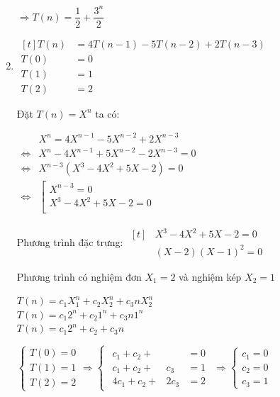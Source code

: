 \documentclass[12pt, letterpaper]{article}
\begin{document}
\begin{enumerate}
	      $ \Rightarrow T(n) = \dfrac{1}{2} + \dfrac{3^n}{2} $

	\item $ \begin{aligned}[t]
			      T(n) & = 4T(n - 1) - 5T(n - 2) + 2T(n - 3) \\
			      T(0) & = 0                                 \\
			      T(1) & = 1                                 \\
			      T(2) & = 2
		      \end{aligned} $

	      Đặt $ T(n) = X^n $ ta có:

	      $ \begin{aligned}
			                      & X^n = 4X^{n - 1} - 5X^{n - 2} + 2X^{n - 3}     \\
			      \Leftrightarrow & X^n - 4X^{n - 1} + 5X^{n - 2} - 2X^{n - 3} = 0 \\
			      \Leftrightarrow & X^{n - 3}(X^3 - 4X^2 + 5X - 2) = 0             \\
			      \Leftrightarrow & \left[
			      \begin{array}{ll}
				      X^{n - 3} = 0           \\
				      X^3 - 4X^2 + 5X - 2 = 0 \\
			      \end{array}
			      \right .
		      \end{aligned} $

	      Phương trình đặc trưng: $ \begin{aligned}[t]
			       & X^3 - 4X^2 + 5X - 2 = 0 \\
			       & (X - 2){(X - 1)}^2 = 0
		      \end{aligned} $

	      Phương trình có nghiệm đơn $ X_1 = 2 $ và nghiệm kép $ X_2 = 1 $

	      $ T(n) = c_1X_1^n + c_2X_2^n + c_3nX_2^n $ \\
	      $ T(n) = c_1 2^n + c_2 1^n + c_3n 1^n $ \\
	      $ T(n) = c_1 2^n + c_2 + c_3n $

	      $ \begin{cases}
			      T(0) = 0 \\
			      T(1) = 1 \\
			      T(2) = 2
		      \end{cases}
		      \Rightarrow{}
		      \begin{cases}
			      \begin{aligned}
				      c_1 + c_2 +  &      & = 0 \\
				      c_1 + c_2 +  & c_3  & = 1 \\
				      4c_1 + c_2 + & 2c_3 & = 2
			      \end{aligned}
		      \end{cases}
		      \Rightarrow{}
		      \begin{cases}
			      c_1 = 0 \\
			      c_2 = 0 \\
			      c_3 = 1
		      \end{cases} $


\end{enumerate}
\end{document}
